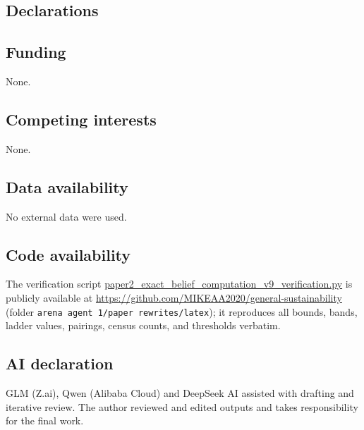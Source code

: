 \documentclass[10pt,twocolumn]{article}
\theoremstyle{plain}
\theoremstyle{definition}
\theoremstyle{remark}
\begin{document}
\subsection*{Declarations}

\subsection*{Funding}
None.

\subsection*{Competing interests}
None.

\subsection*{Data availability}
No external data were used.

\subsection*{Code availability}
The verification script
\url{paper2_exact_belief_computation_v9_verification.py} is publicly
available at \url{https://github.com/MIKEAA2020/general-sustainability}
(folder \texttt{arena agent 1/paper rewrites/latex}); it reproduces all bounds, bands, ladder values, pairings,
census counts, and thresholds verbatim.

\subsection*{AI declaration}
GLM (Z.ai), Qwen (Alibaba Cloud) and DeepSeek AI assisted with drafting
and iterative review. The author reviewed and edited outputs and takes
responsibility for the final work.
\end{document}
